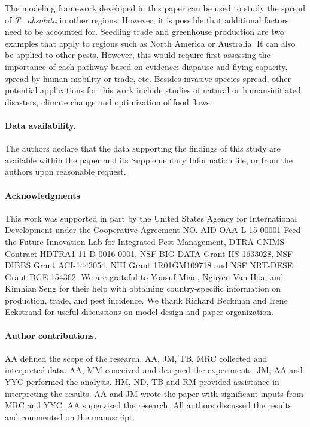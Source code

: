 \documentclass[11pt]{article}
\newcommand{\tuta}{\emph{T.~absoluta}}
\theoremstyle{definition}
\begin{document}
The modeling framework developed in this paper can be used to study the
spread of \tuta{} in other regions. However, it is possible that additional
factors need to be accounted for. Seedling trade and greenhouse production
are two examples that apply to regions such as North America or Australia. 
It can also be applied to other pests. However, this would require first
assessing the importance of each pathway based on evidence: diapause and flying
capacity, spread by human mobility or trade, etc.  Besides invasive species
spread, other potential applications for this work include studies of
natural or human-initiated disasters, climate
change and optimization of food
flows.
 
\paragraph{Data availability.} The authors declare that the data supporting the
findings of this study are available within the paper and its Supplementary
Information file, or from the authors upon reasonable request.

\paragraph{Acknowledgments}
This work was supported in part by the United States Agency for
International Development under the Cooperative Agreement NO.
AID-OAA-L-15-00001 Feed the Future Innovation Lab for Integrated Pest
Management, DTRA CNIMS Contract HDTRA1-11-D-0016-0001, NSF BIG DATA Grant
IIS-1633028, NSF DIBBS Grant ACI-1443054, NIH Grant 1R01GM109718 and NSF
NRT-DESE Grant DGE-154362.  We are grateful to Yousuf Mian, Nguyen Van Hoa,
and Kimhian Seng for their help with obtaining country-specific information
on production, trade, and pest incidence. We thank Richard Beckman and
Irene Eckstrand for useful discussions on model design and paper
organization.

\paragraph{Author contributions.}
AA defined the scope of the
research. AA, JM, TB, MRC collected and interpreted data.
AA, MM conceived and designed the
experiments. JM, AA and YYC performed the
analysis. HM, ND, TB and RM provided assistance in interpreting the
results. AA and JM wrote the paper with significant inputs from
MRC and YYC. AA supervised the research. All authors discussed the
results and commented on the manuscript.



\end{document}
